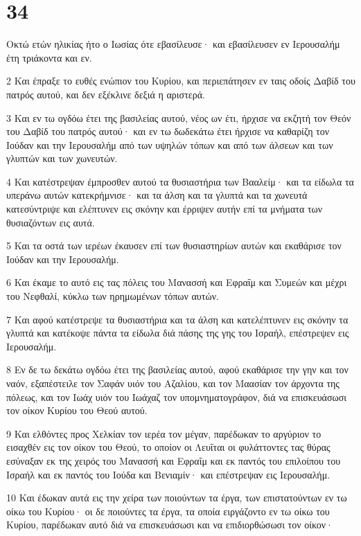 \chapter{34}

\par Οκτώ ετών ηλικίας ήτο ο Ιωσίας ότε εβασίλευσε· και εβασίλευσεν εν Ιερουσαλήμ έτη τριάκοντα και εν.
\par 2 Και έπραξε το ευθές ενώπιον του Κυρίου, και περιεπάτησεν εν ταις οδοίς Δαβίδ του πατρός αυτού, και δεν εξέκλινε δεξιά η αριστερά.
\par 3 Και εν τω ογδόω έτει της βασιλείας αυτού, νέος ων έτι, ήρχισε να εκζητή τον Θεόν του Δαβίδ του πατρός αυτού· και εν τω δωδεκάτω έτει ήρχισε να καθαρίζη τον Ιούδαν και την Ιερουσαλήμ από των υψηλών τόπων και από των άλσεων και των γλυπτών και των χωνευτών.
\par 4 Και κατέστρεψαν έμπροσθεν αυτού τα θυσιαστήρια των Βααλείμ· και τα είδωλα τα υπεράνω αυτών κατεκρήμνισε· και τα άλση και τα γλυπτά και τα χωνευτά κατεσύντριψε και ελέπτυνεν εις σκόνην και έρριψεν αυτήν επί τα μνήματα των θυσιαζόντων εις αυτά.
\par 5 Και τα οστά των ιερέων έκαυσεν επί των θυσιαστηρίων αυτών και εκαθάρισε τον Ιούδαν και την Ιερουσαλήμ.
\par 6 Και έκαμε το αυτό εις τας πόλεις του Μανασσή και Εφραΐμ και Συμεών και μέχρι του Νεφθαλί, κύκλω των ηρημωμένων τόπων αυτών.
\par 7 Και αφού κατέστρεψε τα θυσιαστήρια και τα άλση και κατελέπτυνεν εις σκόνην τα γλυπτά και κατέκοψε πάντα τα είδωλα διά πάσης της γης του Ισραήλ, επέστρεψεν εις Ιερουσαλήμ.
\par 8 Εν δε τω δεκάτω ογδόω έτει της βασιλείας αυτού, αφού εκαθάρισε την γην και τον ναόν, εξαπέστειλε τον Σαφάν υιόν του Αζαλίου, και τον Μαασίαν τον άρχοντα της πόλεως, και τον Ιωάχ υιόν του Ιωάχαζ τον υπομνηματογράφον, διά να επισκευάσωσι τον οίκον Κυρίου του Θεού αυτού.
\par 9 Και ελθόντες προς Χελκίαν τον ιερέα τον μέγαν, παρέδωκαν το αργύριον το εισαχθέν εις τον οίκον του Θεού, το οποίον οι Λευΐται οι φυλάττοντες τας θύρας εσύναξαν εκ της χειρός του Μανασσή και Εφραΐμ και εκ παντός του επιλοίπου του Ισραήλ και εκ παντός του Ιούδα και Βενιαμίν· και επέστρεψαν εις Ιερουσαλήμ.
\par 10 Και έδωκαν αυτά εις την χείρα των ποιούντων τα έργα, των επιστατούντων εν τω οίκω του Κυρίου· οι δε ποιούντες τα έργα, τα οποία ειργάζοντο εν τω οίκω του Κυρίου, παρέδωκαν αυτό διά να επισκευάσωσι και να επιδιορθώσωσι τον οίκον·
